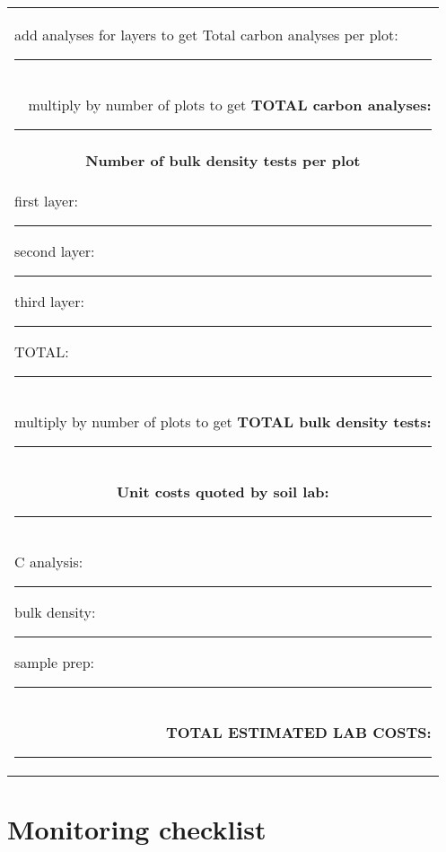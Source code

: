 \documentclass[11pt,letterpaper,oneside,onecolumn]{memoir}
\begin{document}
\begin{tabular}{|lll|}
\multicolumn{3}{l}{\rule[0mm]{0mm}{6mm}add analyses for layers to get Total carbon analyses per plot:\rule[-.1cm]{1cm}{.5pt}} \\
\multicolumn{3}{r}{\rule[-.3cm]{0mm}{.3cm}multiply by number of plots to get \textbf{TOTAL carbon analyses:}\rule[-.1cm]{2cm}{.5pt}}\\ \hline

\multicolumn{3}{|c|}{\rule[-.3cm]{0mm}{.3cm}\textbf{Number of bulk density tests per plot}}\\
\multicolumn{3}{|l|}{first layer: \rule[-.1cm]{1cm}{.5pt} second layer: \rule[-.1cm]{1cm}{.5pt} third layer:\rule[-.1cm]{2cm}{.5pt} TOTAL: \rule[-.1cm]{1cm}{.5pt}}\\
\multicolumn{3}{|l|}{\hfill multiply by number of plots to get \textbf{TOTAL bulk density tests:}\rule[-.1cm]{1cm}{.5pt}}\\ \hline \hline

\multicolumn{3}{|c|}{\rule[-.3cm]{0mm}{.3cm}\textbf{Unit costs quoted by soil lab:}\rule[-.1cm]{6cm}{.5pt}} \\
\multicolumn{3}{|l|}{C analysis: \rule[-.1cm]{1.5cm}{.5pt} bulk density: \rule[-.1cm]{1.5cm}{.5pt} \hspace{1cm} sample prep: \rule[-.1cm]{1.5cm}{.5pt}}\\ \hline

\multicolumn{3}{r}{\rule[0cm]{0mm}{14mm}\textbf{TOTAL ESTIMATED LAB COSTS:}\rule[-1mm]{4cm}{.5pt}}\\
\end{tabular}
\normalsize
\clearpage
\section{Monitoring checklist}
\label{checklist} 
\end{document}
